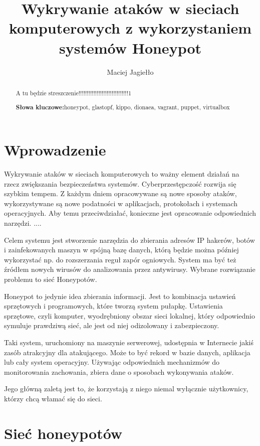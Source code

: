 \documentclass[runningheads,a4paper]{llncs}
\newcommand{\keywords}[1]{\par\addvspace\baselineskip
\noindent\keywordname\enspace\ignorespaces#1}
\renewcommand{\keywordname}{\textbf{Słowa kluczowe:}}
\begin{document}
\mainmatter
\title{Wykrywanie ataków w sieciach komputerowych z wykorzystaniem systemów Honeypot}
\author{Maciej Jagiełło}

\titlerunning{ }
\authorrunning{ }
\institute{}
\maketitle

\begin{abstract}
A tu będzie streszczenie!!!!!!!!!!!!!!!!!!!!!!!!!!!!!!1
\keywords{honeypot, glastopf, kippo, dionaea, vagrant, puppet, virtualbox}
\end{abstract}


\section{Wprowadzenie}

Wykrywanie ataków w sieciach komputerowych to ważny element działań na rzecz zwiększania bezpieczeństwa systemów. Cyberprzestępczość rozwija się szybkim tempem. Z każdym dniem opracowywane są nowe sposoby ataków, wykorzystywane są nowe podatności w aplikacjach, protokołach i systemach operacyjnych. Aby temu przeciwdziałać, konieczne jest opracowanie odpowiednich narzędzi. ....

Celem systemu jest stworzenie narzędzia do zbierania adresów IP hakerów, botów i zainfekowanych maszyn w spójną bazę danych, którą będzie można później wykorzystać np. do rozszerzania reguł zapór ogniowych. System ma być też źródłem nowych wirusów do analizowania przez antywirusy. Wybrane rozwiązanie problemu to sieć Honeypotów.

Honeypot to jedynie idea zbierania informacji. Jest to kombinacja ustawień sprzętowych i programowych, które tworzą system pułapkę. Ustawienia sprzętowe, czyli komputer, wyodrębniony obszar sieci lokalnej, który odpowiednio symuluje prawdziwą sieć, ale jest od niej odizolowany i zabezpieczony.

Taki system, uruchomiony na maszynie serwerowej, udostępnia w Internecie jakiś zasób atrakcyjny dla atakującego. Może to być rekord w bazie danych, aplikacja lub cały system operacyjny. Używając odpowiednich mechanizmów do monitorowania zachowania, zbiera dane o sposobach wykonywania ataków.

Jego główną zaletą jest to, że korzystają z niego niemal wyłącznie użytkownicy, którzy chcą włamać się do sieci.

\section{Sieć honeypotów}
\end{document}
